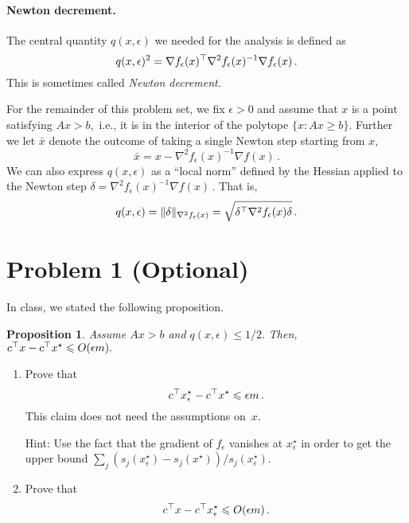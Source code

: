 \documentclass[12pt]{article}
\newtheorem{prop}{Proposition}
\begin{document}
\paragraph{Newton decrement.}
The central quantity $q(x,\epsilon)$ we needed for the analysis is defined as
\[
q(x, \epsilon)^2
= \nabla f_\epsilon(x)^\top
\nabla^2 f_\epsilon(x)^{-1}\nabla f_\epsilon(x)\,.
\]
This is sometimes called \emph{Newton decrement}.

For the remainder of this problem set, we fix $\epsilon>0$ and 
assume that $x$ is a point satisfying
$Ax>b,$ i.e., it is in the interior of the polytope $\{x\colon Ax\ge b\}.$
Further we let $\bar x$ denote the outcome of taking a single Newton step
starting from $x,$
\[
\bar x =  x-\nabla^2 f_\epsilon(x)^{-1}\nabla f(x)\,.
\]
We can also express $q(x,\epsilon)$ as a ``local norm'' defined by the Hessian
applied to the Newton step
$\delta=\nabla^2 f_\epsilon(x)^{-1}\nabla f(x)\,.$
That is,
\[
q(x,\epsilon)=\|\delta\|_{\nabla^2
f_{\epsilon}(x)}=\sqrt{\delta^\top \nabla^2f_\epsilon(x)\delta}\,.
\]

\section{Problem 1 (Optional)}

In class, we stated the following
proposition.

\begin{prop}
Assume $Ax > b$ and $q(x,\epsilon)\le1/2.$ 
Then, $c^\top x - c^\top x^\star\leqslant O(\epsilon m).$
\end{prop}

\begin{enumerate}
\item
Prove that 
\[
c^\top x_{\epsilon}^\star - c^\top x^\star \leqslant \epsilon m\,.
\]
This claim does not need the assumptions on~$x.$

Hint: 
Use the fact that the gradient of $f_\epsilon$ vanishes at $x_\epsilon^\star$ in
order to get the upper bound $\sum_j
(s_j(x_\epsilon^\star)-s_j(x^\star))/s_j(x_\epsilon^\star).$
\item 
Prove that 
\[
c^\top x - c^\top x_{\epsilon}^\star 
\leqslant O(\epsilon m)\,.
\]
\end{enumerate}
%
\end{document}
